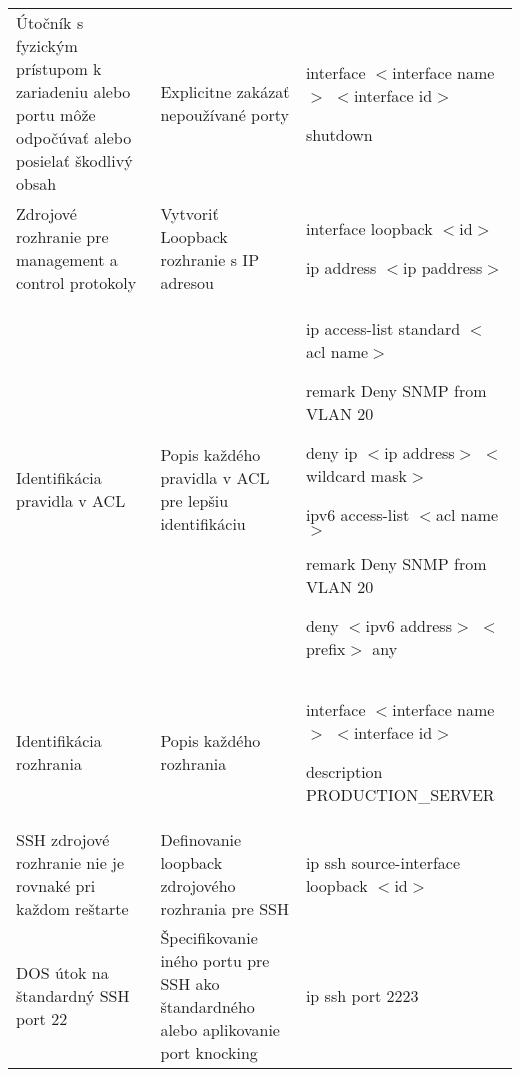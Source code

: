 \begin{longtable}[!htbp]{|L{10em}L{10em}>{\selectfont}L{34em}|}
	
	 Útočník s fyzickým prístupom k zariadeniu alebo portu môže odpočúvať alebo posielať škodlivý obsah	&Explicitne zakázať nepoužívané porty	&interface $<$interface name$>$ $<$interface id$>$
	
	\hspace{0.5em}shutdown\\
	
	
	
	
	Zdrojové rozhranie pre management a control protokoly	&Vytvoriť Loopback rozhranie s IP adresou	&interface loopback $<$id$>$
	
	\hspace{0.5em}ip address $<$ip paddress$>$\\
	
	
	
	
	 Identifikácia pravidla v ACL	&Popis každého pravidla v ACL pre lepšiu identifikáciu	&ip access-list standard $<$acl name$>$
	
	\hspace{0.5em}remark Deny SNMP from VLAN 20
	
	\hspace{0.5em}deny ip $<$ip address$>$ $<$wildcard mask$>$
	\vspace{0.5em}
	
	ipv6 access-list $<$acl name$>$
	
	\hspace{0.5em}remark Deny SNMP from VLAN 20
	
	\hspace{0.5em}deny $<$ipv6 address$>$ $<$prefix$>$ any\\
	
	
	
	
	Identifikácia rozhrania	&Popis každého rozhrania	&interface $<$interface name$>$ $<$interface id$>$
	
	\hspace{0.5em}description PRODUCTION\_SERVER\\
	
	
	
	
	SSH zdrojové rozhranie nie je rovnaké pri každom reštarte	& Definovanie loopback zdrojového rozhrania pre SSH	&ip ssh source-interface loopback $<$id$>$\\
	
	
	
	
	DOS útok na štandardný SSH port 22	&Špecifikovanie iného portu pre SSH ako štandardného alebo aplikovanie port knocking	&ip ssh port 2223
	

\end{longtable}
